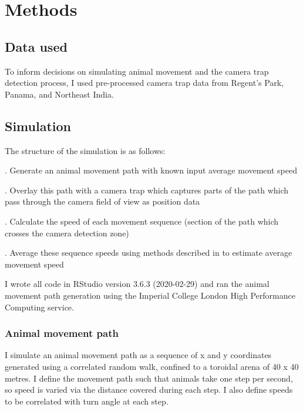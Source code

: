 \documentclass[a4paper,12pt,twoside]{report}
\begin{document}
	
	
	

	
	
	
	
\section{Methods}

\subsection{Data used}

To inform decisions on simulating animal movement and the camera trap detection process, I used pre-processed camera trap data from Regent's Park, Panama, and Northeast India. 

\subsection{Simulation}

The structure of the simulation is as follows:
\medskip

. Generate an animal movement path with known input average movement speed
\medskip

. Overlay this path with a camera trap which captures parts of the path which pass through the camera field of view as position data
\medskip

. Calculate the speed of each movement sequence (section of the path which crosses the camera detection zone)
\medskip

. Average these sequence speeds using methods described in \cite{rowcliffe2016wildlife} to estimate average movement speed
\medskip

\noindent I wrote all code in RStudio version 3.6.3 (2020-02-29) and ran the animal movement path generation using the Imperial College London High Performance Computing service.

\subsubsection{Animal movement path}

I simulate an animal movement path as a sequence of x and y coordinates generated using a correlated random walk, confined to a toroidal arena of 40 x 40 metres. I define the movement path such that animals take one step per second, so speed is varied via the distance covered during each step. I also define speeds to be correlated with turn angle at each step.
\medskip
\end{document}
